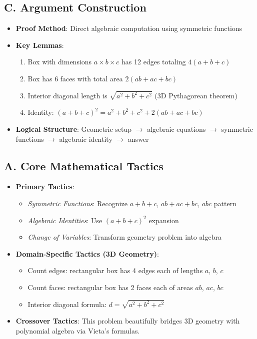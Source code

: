 \documentclass[12pt]{article}
\begin{document}
\begin{strategicbox}
\subsection*{C. Argument Construction}
\begin{itemize}[leftmargin=*]
    \item \textbf{Proof Method}: Direct algebraic computation using symmetric functions
    \item \textbf{Key Lemmas}: 
    \begin{enumerate}
        \item Box with dimensions $a \times b \times c$ has 12 edges totaling $4(a+b+c)$
        \item Box has 6 faces with total area $2(ab+ac+bc)$
        \item Interior diagonal length is $\sqrt{a^2+b^2+c^2}$ (3D Pythagorean theorem)
        \item Identity: $(a+b+c)^2 = a^2+b^2+c^2 + 2(ab+ac+bc)$
    \end{enumerate}
    \item \textbf{Logical Structure}: Geometric setup $\to$ algebraic equations $\to$ symmetric functions $\to$ algebraic identity $\to$ answer
\end{itemize}
\end{strategicbox}

\begin{tacticalbox}
\subsection*{A. Core Mathematical Tactics}
\begin{itemize}[leftmargin=*]
    \item \textbf{Primary Tactics}: 
    \begin{itemize}
        \item \emph{Symmetric Functions}: Recognize $a+b+c$, $ab+ac+bc$, $abc$ pattern
        \item \emph{Algebraic Identities}: Use $(a+b+c)^2$ expansion
        \item \emph{Change of Variables}: Transform geometry problem into algebra
    \end{itemize}
    \item \textbf{Domain-Specific Tactics (3D Geometry)}: 
    \begin{itemize}
        \item Count edges: rectangular box has 4 edges each of lengths $a$, $b$, $c$
        \item Count faces: rectangular box has 2 faces each of areas $ab$, $ac$, $bc$
        \item Interior diagonal formula: $d = \sqrt{a^2+b^2+c^2}$
    \end{itemize}
    \item \textbf{Crossover Tactics}: This problem beautifully bridges 3D geometry with polynomial algebra via Vieta's formulas.
\end{itemize}
\end{tacticalbox}
\end{document}

